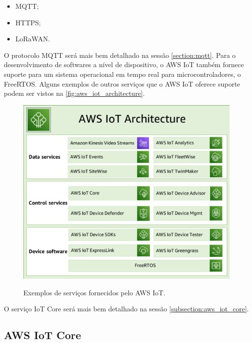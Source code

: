\begin{itemize}
    \item MQTT;
    \item HTTPS;
    \item LoRaWAN.
\end{itemize}

O protocolo MQTT será mais bem detalhado na sessão \autoref{section:mqtt}. Para o desenvolvimento de softwares a nível de dispositivo, o AWS IoT também fornece suporte para um sistema operacional em tempo real para microcontroladores, o FreeRTOS. Alguns exemplos de outros serviços que o AWS IoT oferece suporte podem ser vistos na \autoref{fig:aws_iot_architecture}.

\begin{figure}[htbp]
    \centering
    \caption{Exemplos de serviços fornecidos pelo AWS IoT.}
    \includegraphics[scale=0.7]{Imagens/aws_iot_architecture.png}
    \label{fig:aws_iot_architecture}
\end{figure}

O serviço IoT Core será mais bem detalhado na sessão \autoref{subsection:aws_iot_core}.

\subsection{AWS IoT Core}\label{subsection:aws_iot_core}

